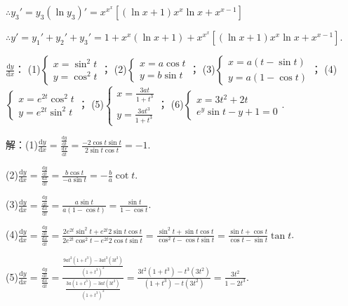 \documentclass[12pt,UTF8]{ctexart}
\begin{document}
\begin{enumerate}
$\therefore y_3'=y_3(\ln y_3)'=x^{x^x}[(\ln x+1)x^x\ln x+x^{x-1}]$

$\therefore y'=y_1'+y_2'+y_3'=1+x^x(\ln x+1)+x^{x^x}[(\ln x+1)x^x\ln x+x^{x-1}]$.

$\frac{\mathrm d y}{\mathrm d x}$：
\newline
(1)$\begin{cases}
x=\sin^2t\\
y=\cos^2t
\end{cases}$；
\newline
(2)$\begin{cases}
x=a\cos t\\
y=b\sin t
\end{cases}$；
\newline
(3)$\begin{cases}
x=a(t-\sin t)\\
y=a(1-\cos t)
\end{cases}$；
\newline
(4)$\begin{cases}
x=e^{2t}\cos^2t\\
y=e^{2t}\sin^2t
\end{cases}$；
\newline
(5)$\begin{cases}
x=\frac{3at}{1+t^3}\\
y=\frac{3at^3}{1+t^3}
\end{cases}$；
\newline
(6)$\begin{cases}
x=3t^2+2t\\
e^y\sin t-y+1=0
\end{cases}$.

解：(1)$\frac{\mathrm dy}{\mathrm dx}=\frac{\frac{\mathrm dy}{\mathrm dt}}{\frac{\mathrm dx}{\mathrm dt}}=\frac{-2\cos t\sin t}{2\sin t\cos t}=-1$.

(2)$\frac{\mathrm dy}{\mathrm dx}=\frac{\frac{\mathrm dy}{\mathrm dt}}{\frac{\mathrm dx}{\mathrm dt}}=\frac{b\cos t}{-a\sin t}=-\frac ba\cot t$.

(3)$\frac{\mathrm dy}{\mathrm dx}=\frac{\frac{\mathrm dy}{\mathrm dt}}{\frac{\mathrm dx}{\mathrm dt}}=\frac{a\sin t}{a(1-\cos t)}=\frac{\sin t}{1-\cos t}$.

(4)$\frac{\mathrm dy}{\mathrm dx}=\frac{\frac{\mathrm dy}{\mathrm dt}}{\frac{\mathrm dx}{\mathrm dt}}=\frac{2e^{2t}\sin^2t+e^{2t}2\sin t\cos t}{2e^{2t}\cos^2t-e^{2t}2\cos t\sin t}=\frac{\sin^2t+\sin t\cos t}{\cos^2t-\cos t\sin t}=\frac{\sin t+\cos t}{\cos t-\sin t}\tan t$.

(5)$\frac{\mathrm dy}{\mathrm dx}=\frac{\frac{\mathrm dy}{\mathrm dt}}{\frac{\mathrm dx}{\mathrm dt}}=\frac{\frac{9at^2(1+t^3)-3at^3(3t^2)}{(1+t^3)^2}}{\frac{3a(1+t^3)-3at(3t^2)}{(1+t^3)^2}}=\frac{3t^2(1+t^3)-t^3(3t^2)}{(1+t^3)-t(3t^2)}=\frac{3t^2}{1-2t^3}$.


\end{enumerate}
\end{document}

